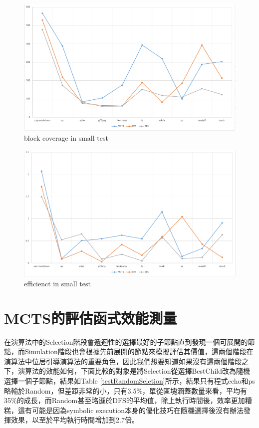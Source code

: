 \documentclass[12pt,a4paper,oneside]{book}
\begin{document}
\begin{figure}[htbp]
\center
\includegraphics[width=\textwidth]{figures/small_block.png}
\caption{block coverage in small test \label{figCoverageSmall}}
\end{figure}

\begin{figure}[htbp]
\center
\includegraphics[width=\textwidth]{figures/small_eff.png}
\caption{efficienct in small test \label{figEffSmall}}
\end{figure}

\section{MCTS的評估函式效能測量}

在演算法中的Selection階段會遞迴性的選擇最好的子節點直到發現一個可展開的節點，而Simulation階段也會根據先前展開的節點來模擬評估其價值，這兩個階段在演算法中位居引導演算法的重要角色，因此我們想要知道如果沒有這兩個階段之下，演算法的效能如何，下面比較的對象是將Selection從選擇BestChild改為隨機選擇一個子節點，結果如Table \ref{testRandomSeletion}所示，結果只有程式echo和ps略輸於Random，但差距非常的小，只有3.5\%，單從區塊涵蓋數量來看，平均有35\%的成長，而Random甚至略遜於DFS的平均值，除上執行時間後，效率更加糟糕，這有可能是因為symbolic execution本身的優化技巧在隨機選擇後沒有辦法發揮效果，以至於平均執行時間增加到2.7倍。
\end{document}

